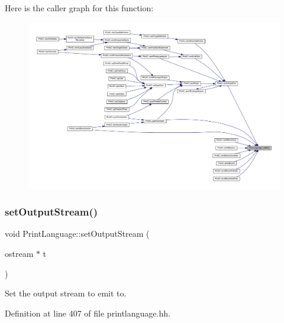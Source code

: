 Here is the caller graph for this function\+:
\nopagebreak
\begin{figure}[H]
\begin{center}
\leavevmode
\includegraphics[width=350pt]{class_print_language_a41989161469e866dc8af2b9f4726fb35_icgraph}
\end{center}
\end{figure}
\mbox{\label{class_print_language_ae18d9d88dd9961e1246329051f67df22}} 
\subsubsection{\texorpdfstring{setOutputStream()}{setOutputStream()}}
{\footnotesize\ttfamily void Print\+Language\+::set\+Output\+Stream (\begin{DoxyParamCaption}\item[{ostream $\ast$}]{t }\end{DoxyParamCaption})\hspace{0.3cm}{\ttfamily [inline]}}



Set the output stream to emit to. 



Definition at line 407 of file printlanguage.\+hh.

